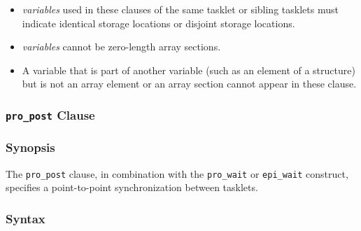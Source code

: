 \begin{itemize}
  \item {\it variables} used in these clauses of the same tasklet or sibling
		tasklets must indicate identical storage locations or disjoint
		storage locations.
  \item {\it variables} cannot be zero-length array sections.
  \item A variable that is part of another variable (such as an element
		of a structure) but is not an array element or an array section
		cannot appear in these clause.
\end{itemize}


%
%

\subsubsection{{\tt pro\_post} Clause}

\subsubsection*{Synopsis}

The \verb|pro_post| clause, in combination with the \verb|pro_wait| or
\verb|epi_wait| construct, specifies a point-to-point synchronization
between tasklets.

\subsubsection*{Syntax}

